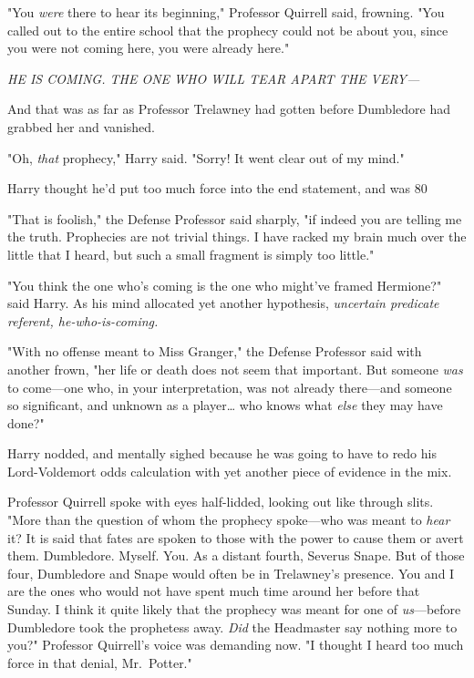 "You \emph{were} there to hear its beginning," Professor Quirrell said, frowning. "You called out to the entire school that the prophecy could not be about you, since you were not coming here, you were already here."

\emph{HE IS COMING. THE ONE WHO WILL TEAR APART THE VERY---}

And that was as far as Professor Trelawney had gotten before Dumbledore had grabbed her and vanished.

"Oh, \emph{that} prophecy," Harry said. "Sorry! It went clear out of my mind."

Harry thought he'd put too much force into the end statement, and was 80%

"That is foolish," the Defense Professor said sharply, "if indeed you are telling me the truth. Prophecies are not trivial things. I have racked my brain much over the little that I heard, but such a small fragment is simply too little."

"You think the one who's coming is the one who might've framed Hermione?" said Harry. As his mind allocated yet another hypothesis, \emph{uncertain predicate referent, he-who-is-coming.}

"With no offense meant to Miss Granger," the Defense Professor said with another frown, "her life or death does not seem that important. But someone \emph{was} to come---one who, in your interpretation, was not already there---and someone so significant, and unknown as a player{\ldots} who knows what \emph{else} they may have done?"

Harry nodded, and mentally sighed because he was going to have to redo his Lord-Voldemort odds calculation with yet another piece of evidence in the mix.

Professor Quirrell spoke with eyes half-lidded, looking out like through slits. "More than the question of whom the prophecy spoke---who was meant to \emph{hear} it? It is said that fates are spoken to those with the power to cause them or avert them. Dumbledore. Myself. You. As a distant fourth, Severus Snape. But of those four, Dumbledore and Snape would often be in Trelawney's presence. You and I are the ones who would not have spent much time around her before that Sunday. I think it quite likely that the prophecy was meant for one of \emph{us}---before Dumbledore took the prophetess away. \emph{Did} the Headmaster say nothing more to you?" Professor Quirrell's voice was demanding now. "I thought I heard too much force in that denial, Mr.~Potter."

